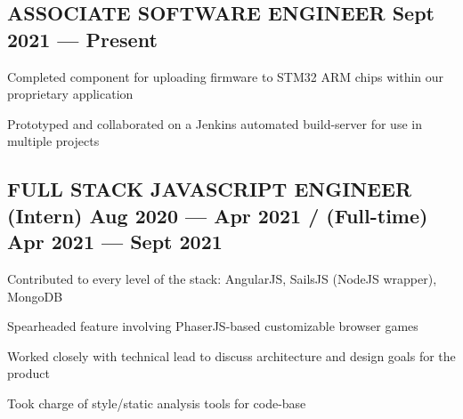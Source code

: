 \documentclass[letter,10pt]{article}
\begin{document}
\subsection{{ASSOCIATE SOFTWARE ENGINEER \texorpdfstring{\hfill}{\space} Sept 2021 --- Present}}
\begin{zitemize}
\item Completed component for uploading firmware to STM32 ARM chips within our proprietary application
\item Prototyped and collaborated on a Jenkins automated build-server for use in multiple projects
\end{zitemize}

\subsection{{FULL STACK JAVASCRIPT ENGINEER \texorpdfstring{\hfill}{\space} (Intern) Aug 2020 --- Apr 2021 / (Full-time) Apr 2021 --- Sept 2021}}
\begin{zitemize}
\item Contributed to every level of the stack: AngularJS, SailsJS (NodeJS wrapper), MongoDB
\item Spearheaded feature involving PhaserJS-based customizable browser games
\item Worked closely with technical lead to discuss architecture and design goals for the product
\item Took charge of style/static analysis tools for code-base
\end{zitemize}

\end{document}
